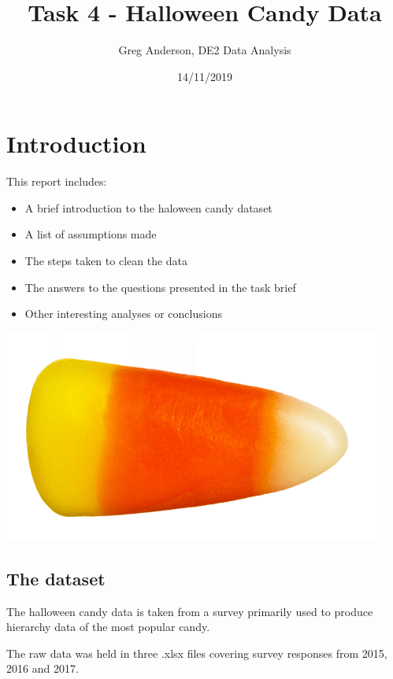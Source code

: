 \documentclass[]{article}
\title{Task 4 - Halloween Candy Data}
\author{Greg Anderson, DE2 Data Analysis}
\date{14/11/2019}
\providecommand{\tightlist}{%
  \setlength{\itemsep}{0pt}\setlength{\parskip}{0pt}}
\begin{document}
\maketitle

\hypertarget{introduction}{%
\section{Introduction}\label{introduction}}

This report includes:

\begin{itemize}
\tightlist
\item
  A brief introduction to the haloween candy dataset\\
\item
  A list of assumptions made\\
\item
  The steps taken to clean the data\\
\item
  The answers to the questions presented in the task brief\\
\item
  Other interesting analyses or conclusions
\end{itemize}

\includegraphics{images/candycorn.png}

\hypertarget{the-dataset}{%
\subsection{The dataset}\label{the-dataset}}

The halloween candy data is taken from a survey primarily used to
produce hierarchy data of the most popular candy.

The raw data was held in three .xlsx files covering survey responses
from 2015, 2016 and 2017.
\end{document}
